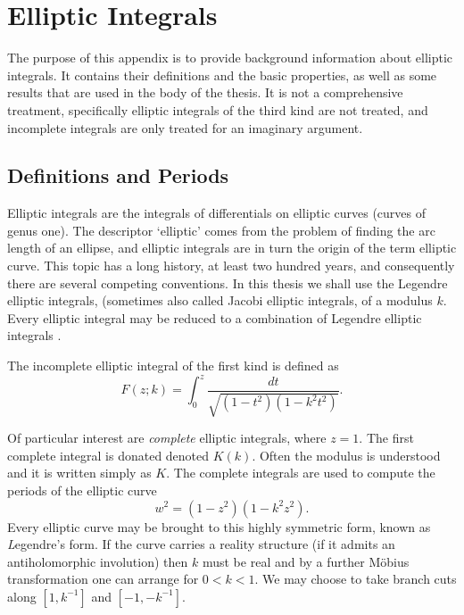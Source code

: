
\chapter{Elliptic Integrals}
\label{chp:Elliptic Integrals}

\stoptocentries

The purpose of this appendix is to provide background information about elliptic integrals. It contains their definitions and the basic properties, as well as some results that are used in the body of the thesis. It is not a comprehensive treatment, specifically elliptic integrals of the third kind are not treated, and incomplete integrals are only treated for an imaginary argument.

\section{Definitions and Periods}
Elliptic integrals are the integrals of differentials on elliptic curves (curves of genus one). The descriptor `elliptic' comes from the problem of finding the arc length of an ellipse, and elliptic integrals are in turn the origin of the term elliptic curve. This topic has a long history, at least two hundred years, and consequently there are several competing conventions. In this thesis we shall use the Legendre elliptic integrals, (sometimes also called Jacobi elliptic integrals, of a modulus $k$. Every elliptic integral may be reduced to a combination of Legendre elliptic integrals \cite{armitage2006elliptic,Hancock1910}.

\begin{defn}
The incomplete elliptic integral of the first kind is defined as
\[
F(z;k) = \int_0^z \frac{dt}{\sqrt{(1-t^2)(1-k^2 t^2)}}.
\]
\end{defn}

Of particular interest are \emph{complete} elliptic integrals, where $z=1$. The first complete integral is donated denoted $K(k)$. Often the modulus is understood and it is written simply as $K$. The complete integrals are used to compute the periods of the elliptic curve
\[
w^2 = (1-z^2)(1-k^2 z^2).
\]
Every elliptic curve may be brought to this highly symmetric form, known as {\emph Legendre's form}. If the curve carries a reality structure (if it admits an antiholomorphic involution) then $k$ must be real and by a further M\"obius transformation one can arrange for $0 < k < 1$. We may choose to take branch cuts along $[1,k^{-1}]$ and $[-1,-k^{-1}]$.

